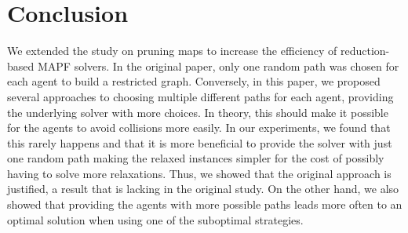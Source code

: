 \section{Conclusion}

We extended the study on pruning maps to increase the efficiency of reduction-based MAPF solvers. In the original paper, only one random path was chosen for each agent to build a restricted graph. Conversely, in this paper, we proposed several approaches to choosing multiple different paths for each agent, providing the underlying solver with more choices. In theory, this should make it possible for the agents to avoid collisions more easily. In our experiments, we found that this rarely happens and that it is more beneficial to provide the solver with just one random path making the relaxed instances simpler for the cost of possibly having to solve more relaxations. Thus, we showed that the original approach is justified, a result that is lacking in the original study.
%
On the other hand, we also showed that providing the agents with more possible paths leads more often to an optimal solution when using one of the suboptimal strategies.
%
